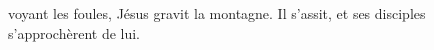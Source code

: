 \encetemps voyant les foules, Jésus gravit la montagne.
Il s’assit, et ses disciples s’approchèrent de lui.
